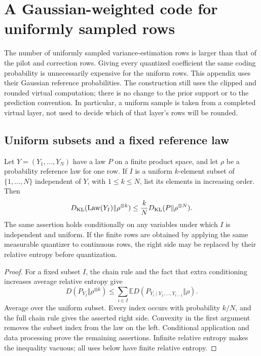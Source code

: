 \section{A Gaussian-weighted code for uniformly sampled rows}
\label{app:weighted-entropy}

The number of uniformly sampled variance-estimation rows is larger than
that of the pilot and correction rows. Giving every quantized coefficient
the same coding probability is unnecessarily expensive for the uniform
rows. This appendix uses their Gaussian reference probabilities. The
construction still uses the clipped and rounded virtual computation;
there is no change to the prior support or to the prediction convention.
In particular, a uniform sample is taken from a completed virtual layer,
not used to decide which of that layer's rows will be rounded.

\subsection{Uniform subsets and a fixed reference law}

\begin{lemma}
\label{lem:weighted-shearer}
Let $Y=(Y_1,\ldots,Y_N)$ have a law $P$ on a finite product space, and
let $\rho$ be a probability reference law for one row. If $I$ is a
uniform $k$-element subset of $\{1,\ldots,N\}$ independent of $Y$,
with $1\le k\le N$, list its elements in increasing order. Then
\[
 D_{\rm KL}(\operatorname{Law}(Y_I)\Vert\rho^{\otimes k})
 \le\frac{k}{N}D_{\rm KL}(P\Vert\rho^{\otimes N}).
\]
The same assertion holds conditionally on any variables under which $I$
is independent and uniform. If the finite rows are obtained by applying
the same measurable quantizer to continuous rows, the right side may
be replaced by their relative entropy before quantization.
\end{lemma}
\begin{proof}
For a fixed subset $I$, the chain rule and the fact that extra
conditioning increases average relative entropy give
\[
 D(P_{Y_I}\Vert\rho^{\otimes k})
 \le\sum_{i\in I}\mathbb E
 D(P_{Y_i\mid Y_1,\ldots,Y_{i-1}}\Vert\rho).
\]
Average over the uniform subset. Every index occurs with probability
$k/N$, and the full chain rule gives the asserted right side.
Convexity in the first argument removes the subset index from the law
on the left. Conditional application and data processing prove the
remaining assertions. Infinite relative entropy makes the inequality
vacuous; all uses below have finite relative entropy.
\end{proof}

